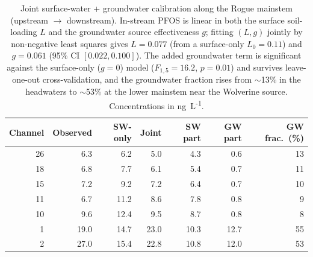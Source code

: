 \begin{table}[t]
  \centering
  \footnotesize
  \caption{Joint surface-water + groundwater calibration along the Rogue
  mainstem (upstream $\to$ downstream). In-stream PFOS is linear in both the
  surface soil-loading $L$ and the groundwater source effectiveness $g$;
  fitting $(L,g)$ jointly by non-negative least squares gives $L=0.077$ (from a
  surface-only $L_0=0.11$) and $g=0.061$ (95\% CI $[0.022,0.100]$). The added
  groundwater term is significant against the surface-only ($g=0$) model
  ($F_{1,5}=16.2$, $p=0.01$) and survives leave-one-out cross-validation, and
  the groundwater fraction rises from $\sim$13\% in the headwaters to $\sim$53\%
  at the lower mainstem near the Wolverine source. Concentrations in
  ng~L\textsuperscript{-1}.}
  \label{tab:jointreach}
  \begin{tabular}{@{}rrrrrrr@{}}
    \toprule
    Channel & Observed & SW-only & Joint & SW part & GW part & GW frac.\ (\%) \\
    \midrule
    26 &  6.3 &  6.2 &  5.0 &  4.3 &  0.6 & 13 \\
    18 &  6.8 &  7.7 &  6.1 &  5.4 &  0.7 & 11 \\
    15 &  7.2 &  9.2 &  7.2 &  6.4 &  0.7 & 10 \\
    11 &  6.7 & 11.2 &  8.6 &  7.8 &  0.8 &  9 \\
    10 &  9.6 & 12.4 &  9.5 &  8.7 &  0.8 &  8 \\
     1 & 19.0 & 14.7 & 23.0 & 10.3 & 12.7 & 55 \\
     2 & 27.0 & 15.4 & 22.8 & 10.8 & 12.0 & 53 \\
    \bottomrule
  \end{tabular}
\end{table}
